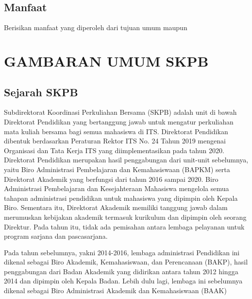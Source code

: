 \documentclass{file/KP-ITS}
\theoremstyle{definition}
\theoremstyle{definition}
\theoremstyle{plain}
\begin{document}
\section{Manfaat}
Berisikan manfaat yang diperoleh dari tujuan umum maupun


\pagebreak
\chapter{GAMBARAN UMUM SKPB}

\section{Sejarah SKPB}
Subdirektorat Koordinasi Perkuliahan Bersama (SKPB) adalah unit di bawah Direktorat Pendidikan yang bertanggung jawab untuk mengatur perkuliahan mata kuliah bersama bagi semua mahasiswa di ITS. Direktorat Pendidikan dibentuk berdasarkan Peraturan Rektor ITS No. 24 Tahun 2019 mengenai Organisasi dan Tata Kerja ITS yang diimplementasikan pada tahun 2020. Direktorat Pendidikan merupakan hasil penggabungan dari unit-unit sebelumnya, yaitu Biro Administrasi Pembelajaran dan Kemahasiswaan (BAPKM) serta Direktorat Akademik yang berfungsi dari tahun 2016 sampai 2020. Biro Administrasi Pembelajaran dan Kesejahteraan Mahasiswa mengelola semua tahapan administrasi pendidikan untuk mahasiswa yang dipimpin oleh Kepala Biro. Sementara itu, Direktorat Akademik memiliki tanggung jawab dalam merumuskan kebijakan akademik termasuk kurikulum dan dipimpin oleh seorang Direktur. Pada tahun itu, tidak ada pemisahan antara lembaga pelayanan untuk program sarjana dan pascasarjana. 

Pada tahun sebelumnya, yakni 2014-2016, lembaga administrasi Pendidikan ini dikenal sebagai Biro Akademik, Kemahasiswaan, dan Perencanaan (BAKP), hasil penggabungan dari Badan Akademik yang didirikan antara tahun 2012 hingga 2014 dan dipimpin oleh Kepala Badan. Lebih dulu lagi, lembaga ini sebelumnya dikenal sebagai Biro Administrasi Akademik dan Kemahasiswaan (BAAK)
\end{document}
